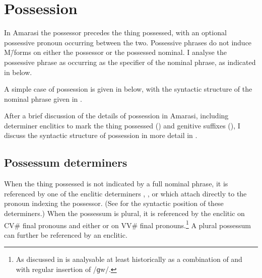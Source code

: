 \section{Possession}\label{sec:Poss}
In Amarasi the possessor precedes the thing possessed,
with an optional possessive pronoun occurring between the two.
Possessive phrases do not induce M\=/forms on either the possessor or the possessed nominal.
I analyse the possessive phrase as occurring as the specifier of the nominal phrase,
as indicated in  below.

\begin{exe}
	\label{tr:PossP2}
\end{exe}

A simple case of possession is given in  below,
with the syntactic structure of the nominal phrase given in .

\begin{exe}
	\label{ex:130921-1, 0.50}
	\label{tr:130921-1, 0.50}
\end{exe}

After a brief discussion of the details of possession in Amarasi, including
determiner enclitics to mark the thing possessed ()
and genitive suffixes (), I discuss the syntactic structure
of possession in more detail in .

\subsection{Possessum determiners}\label{sec:PosDet}
When the thing possessed is not indicated by a full nominal phrase,
it is referenced by one of the enclitic determiners
, ,  or  which
attach directly to the pronoun indexing the possessor.
(See  for the syntactic position of these determiners.)
When the possessum is plural, it is referenced by the enclitic
 on CV{\#} final pronouns and either  or  on VV{\#} final pronouns.\footnote{
		As discussed in   is analysable at least historically
		as a combination of  and  with regular insertion of /ɡw/.}
A plural possessum can further be referenced by an enclitic.

